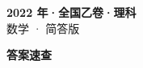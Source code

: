 \documentclass[zihao=-4, a4paper]{ctexart}
\begin{document}
\begin{center}
  {\Large\bfseries 2022 年·全国乙卷·理科}\\[4pt]
  {\large 数学 · 简答版}
\end{center}
\medskip
{}

\clearpage
{}
\begin{center}{\Large\bfseries 答案速查}\end{center}
\medskip

\end{document}
